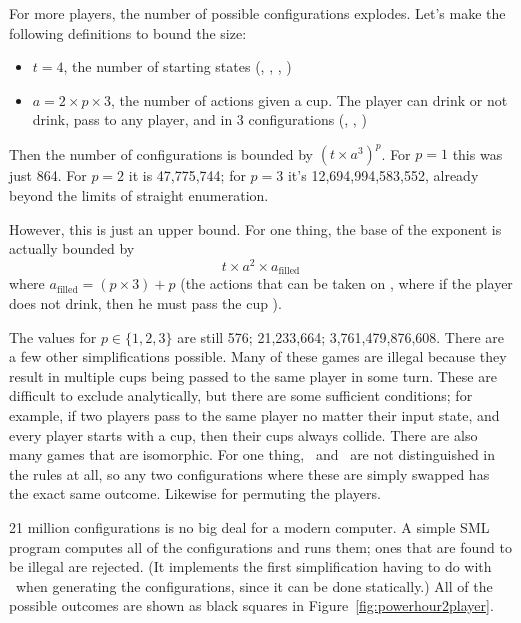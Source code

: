 \documentclass[twocolumn]{article}
\newcommand\comment[1]{}
\begin{document}
For more players, the number of possible configurations explodes.
Let's make the following definitions to bound the size:
\begin{itemize}
\item $t = 4$, the number of starting states (\fullcup, \emptycup,
  \overcup, \nocup)
\item $a = 2 \times p \times 3$, the number of actions given a cup.
  The player can drink or not drink, pass to any player, and in 3
  configurations (\fullcup, \emptycup, \overcup)
\end{itemize}
Then the number of configurations is bounded by $(t \times a^3)^p$. For
$p=1$ this was just 864. For $p=2$ it is 47,775,744; for $p=3$ it's
12,694,994,583,552, already beyond the limits of straight enumeration.

\comment{
fun ct (p : IntInf.int) =
  let val s = 4
      fun pow n 0 = 1
        | pow n m = n * pow n (m - 1)
      val a = 2 * p * 3
   in
      pow (s * pow a 3) p
  end
}

However, this is just an upper bound. For one thing, the base of the
exponent is actually bounded by
$$
  t \times a^2 \times a_{\textrm{filled}}
$$
where
$a_{\textrm{filled}} = (p \times 3) + p$ (the actions that can be taken on
\fullcup, where if the player does not drink, then he must pass the
cup \fullcup).

\comment{
fun ctb (p : IntInf.int) =
  let val s = 4
      fun pow n 0 = 1
        | pow n m = n * pow n (m - 1)
      val af = p * 3 + p
      val a = 2 * p * 3
   in
      pow (s * pow a 2 * af) p
  end
}

The values for $p \in \{1,2,3\}$ are still 576; 21,233,664;
3,761,479,876,608. There are a few other simplifications possible.
Many of these games are illegal because they result in multiple cups
being passed to the same player in some turn. These are difficult to
exclude analytically, but there are some sufficient conditions; for
example, if two players pass to the same player no matter their input
state, and every player starts with a cup, then their cups always
collide. There are also many games that are isomorphic. For one thing,
\emptycup\ and \overcup\ are not distinguished in the rules at all, so
any two configurations where these are simply swapped has the exact
same outcome. Likewise for permuting the players.

21 million configurations is no big deal for a modern computer. A
simple SML program computes all of the configurations and runs them;
ones that are found to be illegal are rejected. (It implements the
first simplification having to do with \fullcup\ when generating the
configurations, since it can be done statically.) All of the possible
outcomes are shown as black squares in Figure~\ref{fig:powerhour2player}.
\end{document}
